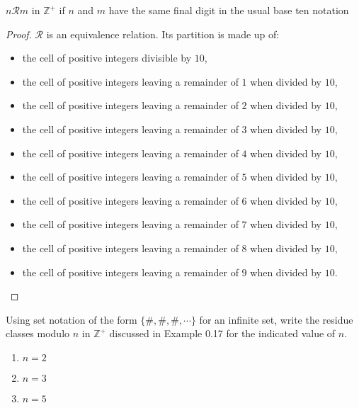 \newpage
\begin{exercise}
    $n\mathscr{R}m$ in $\mathbb{Z}^{+}$ if $n$ and $m$ have the same final digit in the usual base ten notation
\end{exercise}

\begin{proof}
    $\mathscr{R}$ is an equivalence relation. Its partition is made up of:
    \begin{itemize}
        \item the cell of positive integers divisible by $10$,
        \item the cell of positive integers leaving a remainder of $1$ when divided by $10$,
        \item the cell of positive integers leaving a remainder of $2$ when divided by $10$,
        \item the cell of positive integers leaving a remainder of $3$ when divided by $10$,
        \item the cell of positive integers leaving a remainder of $4$ when divided by $10$,
        \item the cell of positive integers leaving a remainder of $5$ when divided by $10$,
        \item the cell of positive integers leaving a remainder of $6$ when divided by $10$,
        \item the cell of positive integers leaving a remainder of $7$ when divided by $10$,
        \item the cell of positive integers leaving a remainder of $8$ when divided by $10$,
        \item the cell of positive integers leaving a remainder of $9$ when divided by $10$.
    \end{itemize}
\end{proof}

\newpage
\begin{exercise}
    Using set notation of the form $\{ \#, \#, \#, \cdots \}$ for an infinite set, write the residue classes modulo $n$ in $\mathbb{Z}^{+}$ discussed in Example 0.17 for the indicated value of $n$.
    \begin{enumerate}[label={\textbf{\alph*.}},itemsep=0pt]
        \item $n = 2$
        \item $n = 3$
        \item $n = 5$
    \end{enumerate}
\end{exercise}

